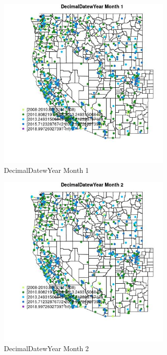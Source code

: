 \begin{figure} 
\centering  
\includegraphics[width=0.77\textwidth]{Code_Outputs/Report_ML_input_PM25_Step4_part_e_de_duplicated_aveswNAs_MapObsMo1DecimalDatewYear.jpg} 
\caption{\label{fig:Report_ML_input_PM25_Step4_part_e_de_duplicated_aveswNAsMapObsMo1DecimalDatewYear}DecimalDatewYear Month 1} 
\end{figure} 
 

\clearpage 

\begin{figure} 
\centering  
\includegraphics[width=0.77\textwidth]{Code_Outputs/Report_ML_input_PM25_Step4_part_e_de_duplicated_aveswNAs_MapObsMo2DecimalDatewYear.jpg} 
\caption{\label{fig:Report_ML_input_PM25_Step4_part_e_de_duplicated_aveswNAsMapObsMo2DecimalDatewYear}DecimalDatewYear Month 2} 
\end{figure} 
 

